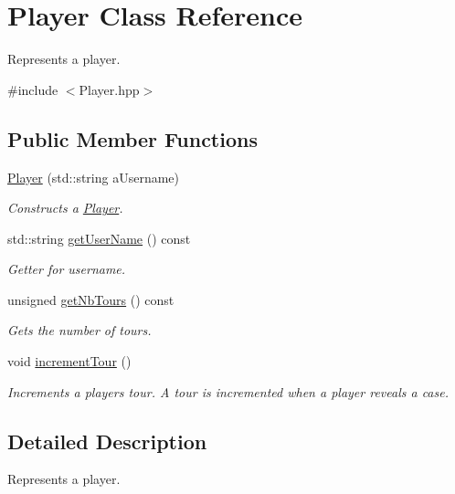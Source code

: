 \hypertarget{class_player}{}\section{Player Class Reference}
\label{class_player}


Represents a player.  




{\ttfamily \#include $<$Player.\+hpp$>$}

\subsection*{Public Member Functions}
\begin{DoxyCompactItemize}
\item 
\hyperlink{class_player_a71fac0ea4a91136e15d0c6e97ec1c7f5}{Player} (std\+::string a\+Username)
\begin{DoxyCompactList}\small\item\em Constructs a \hyperlink{class_player}{Player}. \end{DoxyCompactList}\item 
std\+::string \hyperlink{class_player_a67ad1224529fafaa55fa35bcec72c211}{get\+User\+Name} () const
\begin{DoxyCompactList}\small\item\em Getter for username. \end{DoxyCompactList}\item 
\mbox{\label{class_player_a66eee95dd3eb0e8f4a0dd9274351365a}} 
unsigned \hyperlink{class_player_a66eee95dd3eb0e8f4a0dd9274351365a}{get\+Nb\+Tours} () const
\begin{DoxyCompactList}\small\item\em Gets the number of tours. \end{DoxyCompactList}\item 
\mbox{\label{class_player_a2c91170a6af84de3810cc78370abebd9}} 
void \hyperlink{class_player_a2c91170a6af84de3810cc78370abebd9}{increment\+Tour} ()
\begin{DoxyCompactList}\small\item\em Increments a player\textquotesingle{}s tour. A tour is incremented when a player reveals a case. \end{DoxyCompactList}\end{DoxyCompactItemize}


\subsection{Detailed Description}
Represents a player. 

